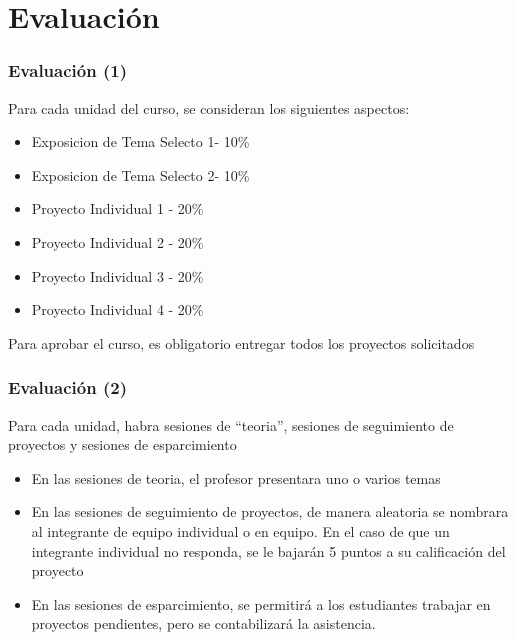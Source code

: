 \section{Evaluación}

\begin{frame}
\frametitle{Evaluación (1)}
Para cada unidad del curso, se consideran los siguientes aspectos:
\begin{itemize}
\item Exposicion de Tema Selecto 1- 10\%
\item Exposicion de Tema Selecto 2- 10\%
\item Proyecto Individual 1 - 20\%
\item Proyecto Individual 2 - 20\%
\item Proyecto Individual 3 - 20\%
\item Proyecto Individual 4 - 20\%
\end{itemize}
Para aprobar el curso, es obligatorio entregar todos los proyectos solicitados
\end{frame}

\begin{frame}
\frametitle{Evaluación (2)}
Para cada unidad, habra sesiones de ``teoria'', sesiones de seguimiento de proyectos y sesiones de esparcimiento
\begin{itemize}
\item En las sesiones de teoria, el profesor presentara uno o varios temas
\item En las sesiones de seguimiento de proyectos, de manera aleatoria se nombrara al integrante de equipo individual o en equipo. En el caso de que un integrante individual no responda, se le bajarán 5 puntos a su calificación del proyecto
\item En las sesiones de esparcimiento, se permitirá a los estudiantes trabajar en proyectos pendientes, pero se contabilizará la asistencia. 
\end{itemize}
\end{frame}

